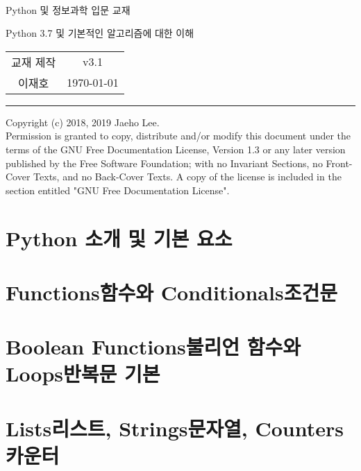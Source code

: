 \documentclass[a4paper, 10pt, twoside, calcwidth]{oblivoir}
\begin{document}
\begin{center}\sffamily
\text{}\\[1cm]
\huge Python 및 정보과학 입문 교재

\vspace{.1cm}
\Large Python 3.7 및 기본적인 알고리즘에 대한 이해\\[.6cm]
	\begin{tabular} {c c}
		교재 제작 & v3.1\\
		이재호 & \today
	\end{tabular}
\end{center}
\vspace{.5cm}
\noindent\rule[0.5ex]{\linewidth}{.5pt}
\tableofcontents*

\vspace{2cm}
{\scriptsize
\noindent Copyright (c)  2018, 2019  Jaeho Lee.\\
Permission is granted to copy, distribute and/or modify this document
under the terms of the GNU Free Documentation License, Version 1.3
or any later version published by the Free Software Foundation;
with no Invariant Sections, no Front-Cover Texts, and no Back-Cover Texts.
A copy of the license is included in the section entitled "GNU
Free Documentation License".
}

\pagebreak

\section{Python 소개 및 기본 요소}



\section{Functions함수와 Conditionals조건문}

% 

\section{Boolean Functions불리언 함수와 Loops반복문 기본}

% 

\section{Lists리스트, Strings문자열, Counters카운터}

% 
\end{document}
